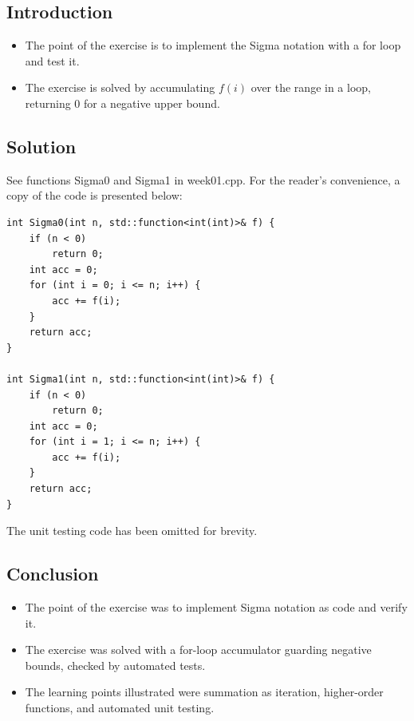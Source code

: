 \documentclass[12pt]{article}
\begin{document}

\subsection{Introduction}

\begin{itemize}

\item
  The point of the exercise is to implement the Sigma notation with a for loop and test it.

\item
  The exercise is solved by accumulating $f(i)$ over the range in a loop, returning 0 for a negative upper bound.

\end{itemize}


\subsection{Solution}

See functions Sigma0 and Sigma1 in week01.cpp. For the reader's convenience, a copy of the code is presented below:

\begin{verbatim}
int Sigma0(int n, std::function<int(int)>& f) {
    if (n < 0)
        return 0;
    int acc = 0;
    for (int i = 0; i <= n; i++) {
        acc += f(i);
    }
    return acc;
}

int Sigma1(int n, std::function<int(int)>& f) {
    if (n < 0)
        return 0;
    int acc = 0;
    for (int i = 1; i <= n; i++) {
        acc += f(i);
    }
    return acc;
}
\end{verbatim}

The unit testing code has been omitted for brevity.


\subsection{Conclusion}

\begin{itemize}

\item
  The point of the exercise was to implement Sigma notation as code and verify it.

\item
  The exercise was solved with a for-loop accumulator guarding negative bounds, checked by automated tests.

\item
  The learning points illustrated were summation as iteration, higher-order functions, and automated unit testing.

\end{itemize}
\end{document}
